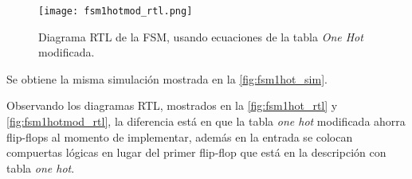 \enter


\begin{figure}[ht]
	\centering
	\texttt{[image: fsm1hotmod\_rtl.png]}
	\caption{
		Diagrama RTL de la FSM, usando ecuaciones de la tabla \textit{One Hot} modificada.
		\label{fig:fsm1hotmod_rtl}
	}
\end{figure}

Se obtiene la misma simulación mostrada en la \autoref{fig:fsm1hot_sim}.

\enter

Observando los diagramas RTL, mostrados en la \autoref{fig:fsm1hot_rtl} y
\autoref{fig:fsm1hotmod_rtl}, la diferencia está en que la tabla \textit{one hot} modificada ahorra flip-flops al momento de implementar, además en la entrada se colocan compuertas lógicas en lugar del primer flip-flop que está en la descripción con tabla \textit{one hot}.

